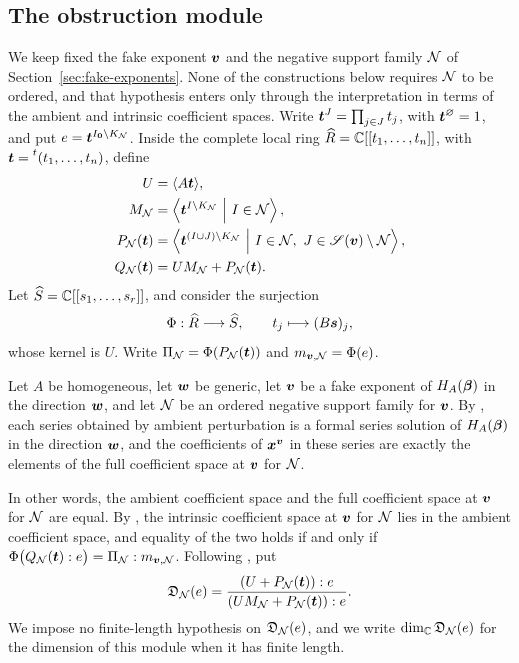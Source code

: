 \subsection{The obstruction module}

We keep fixed the fake exponent \(\boldsymbol{v}\) and the negative support family \(\mathcal N\) of Section~\ref{sec:fake-exponents}.
None of the constructions below requires \(\mathcal N\) to be ordered, and that hypothesis enters only through the interpretation in terms of the ambient and intrinsic coefficient spaces.
Write \(\boldsymbol{t}^J=\prod_{j\in J}t_j\), with \(\boldsymbol{t}^{\varnothing}=1\), and put \(e=\boldsymbol{t}^{I_{\boldsymbol{0}}\setminus K_{\mathcal N}}\).
Inside the complete local ring \(\widehat R=\mathbb C[[t_1,\ldots,t_n]]\), with \(\boldsymbol{t}=\prescript{t}{}{(t_1,\ldots,t_n)}\), define
\begin{align}
	U&=\langle A\boldsymbol{t}\rangle,
	\label{eq:obstruction-U}\\
	M_{\mathcal N}
	&=\left\langle
	\boldsymbol{t}^{I\setminus K_{\mathcal N}}
	\ \middle|\ I\in\mathcal N
	\right\rangle,
	\label{eq:obstruction-M}\\
	P_{\mathcal N}(\boldsymbol{t})
	&=\left\langle
	\boldsymbol{t}^{(I\cup J)\setminus K_{\mathcal N}}
	\ \middle|\
	I\in\mathcal N,\ J\in\mathscr S(\boldsymbol{v})\setminus\mathcal N
	\right\rangle,
	\label{eq:obstruction-P}\\
	Q_{\mathcal N}(\boldsymbol{t})
	&=UM_{\mathcal N}+P_{\mathcal N}(\boldsymbol{t}).
	\label{eq:obstruction-Q}
\end{align}
Let \(\widehat S=\mathbb C[[s_1,\ldots,s_r]]\), and consider the surjection
\[
	\Phi:\widehat R\longrightarrow\widehat S, \qquad t_j\longmapsto(B\boldsymbol{s})_j,
\]
whose kernel is \(U\).
Write \(\Pi_{\mathcal N}=\Phi(P_{\mathcal N}(\boldsymbol{t}))\) and \(m_{\boldsymbol{v},\mathcal N}=\Phi(e)\).

\begin{fact}
	\label{fact:ambient-realization}
	Let \(A\) be homogeneous, let \(\boldsymbol{w}\) be generic, let \(\boldsymbol{v}\) be a fake exponent of \(H_A(\boldsymbol{\beta})\) in the direction \(\boldsymbol{w}\), and let \(\mathcal N\) be an ordered negative support family for \(\boldsymbol{v}\).
	By \cite[Theorem~5.5]{OS25}, each series obtained by ambient perturbation is a formal series solution of \(H_A(\boldsymbol{\beta})\) in the direction \(\boldsymbol{w}\), and the coefficients of \(\boldsymbol{x}^{\boldsymbol{v}}\) in these series are exactly the elements of the full coefficient space at \(\boldsymbol{v}\) for \(\mathcal N\).
\end{fact}

In other words, the ambient coefficient space and the full coefficient space at \(\boldsymbol{v}\) for \(\mathcal N\) are equal.
By \cite[Proposition~6.2]{OS25}, the intrinsic coefficient space at \(\boldsymbol{v}\) for \(\mathcal N\) lies in the ambient coefficient space, and equality of the two holds if and only if \(\Phi\bigl(Q_{\mathcal N}(\boldsymbol{t}):e\bigr) = \Pi_{\mathcal N}:m_{\boldsymbol{v},\mathcal N}\).
Following \cite{Nak26}, put
\begin{equation}
	\mathfrak D_{\mathcal N}(e)
	=
	\frac{(U+P_{\mathcal N}(\boldsymbol{t})):e}
	{(UM_{\mathcal N}+P_{\mathcal N}(\boldsymbol{t})):e}.
	\label{eq:defect-module}
\end{equation}
We impose no finite-length hypothesis on \(\mathfrak D_{\mathcal N}(e)\), and we write \(\dim_{\mathbb C}\mathfrak D_{\mathcal N}(e)\) for the dimension of this module when it has finite length.

